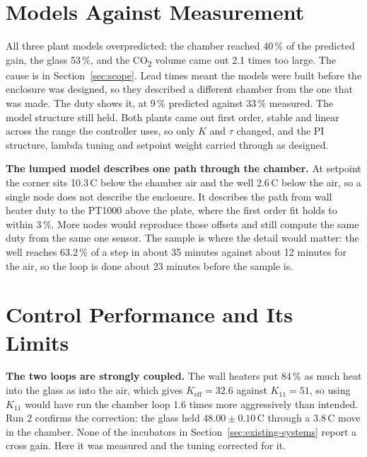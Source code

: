 \section{Models Against Measurement}
\label{sec:disc-models}

All three plant models overpredicted: the chamber reached 40\,\% of the predicted gain, the glass 53\,\%, and the CO\textsubscript{2} volume came out 2.1 times too large. The cause is in Section~\ref{sec:scope}. Lead times meant the models were built before the enclosure was designed, so they described a different chamber from the one that was made. The duty shows it, at 9\,\% predicted against 33\,\% measured. The model structure still held. Both plants came out first order, stable and linear across the range the controller uses, so only $K$ and $\tau$ changed, and the PI structure, lambda tuning and setpoint weight carried through as designed.

\textbf{The lumped model describes one path through the chamber.} At setpoint the corner sits 10.3\,\textdegree{}C below the chamber air and the well 2.6\,\textdegree{}C below the air, so a single node does not describe the enclosure. It describes the path from wall heater duty to the PT1000 above the plate, where the first order fit holds to within 3\,\%. More nodes would reproduce those offsets and still compute the same duty from the same one sensor. The sample is where the detail would matter: the well reaches 63.2\,\% of a step in about 35 minutes against about 12 minutes for the air, so the loop is done about 23 minutes before the sample is.

\section{Control Performance and Its Limits}
\label{sec:disc-control}

\textbf{The two loops are strongly coupled.} The wall heaters put 84\,\% as much heat into the glass as into the air, which gives $K_\mathrm{eff} = 32.6$ against $K_{11} = 51$, so using $K_{11}$ would have run the chamber loop 1.6 times more aggressively than intended. Run 2 confirms the correction: the glass held $48.00 \pm 0.10$\,\textdegree{}C through a 3.8\,\textdegree{}C move in the chamber. None of the incubators in Section~\ref{sec:existing-systems} report a cross gain. Here it was measured and the tuning corrected for it.

